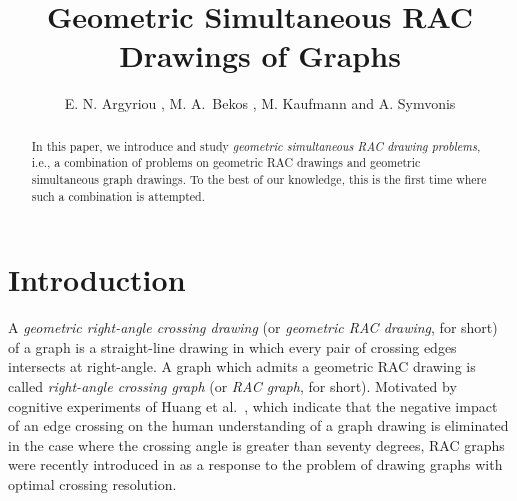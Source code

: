 \documentclass{llncs}
\begin{document}
\title{Geometric Simultaneous RAC Drawings of Graphs}

\author{E. N. Argyriou , M. A.\ Bekos , M. Kaufmann  and A. Symvonis }






\maketitle

\begin{abstract}
In this paper, we introduce and study \emph{geometric simultaneous
RAC drawing problems}, i.e., a combination of problems on geometric
RAC drawings and geometric simultaneous graph drawings. To the best
of our knowledge, this is the first time where such a combination is
attempted.
\end{abstract}



\section{Introduction}
\label{sec:introduction}
A \emph{geometric right-angle crossing drawing} (or \emph{geometric
RAC drawing}, for short) of a graph is a straight-line drawing in
which every pair of crossing edges intersects at right-angle. A
graph which admits a geometric RAC drawing is called
\emph{right-angle crossing graph} (or \emph{RAC graph}, for short).
Motivated by cognitive experiments of Huang et al.\
\cite{Hu07,HHE08}, which indicate that the negative impact of an
edge crossing on the human understanding of a graph drawing is
eliminated in the case where the crossing angle is greater than
seventy degrees, RAC graphs were recently introduced in \cite{DEL09}
as a response to the problem of drawing graphs with optimal crossing
resolution.
\end{document}
